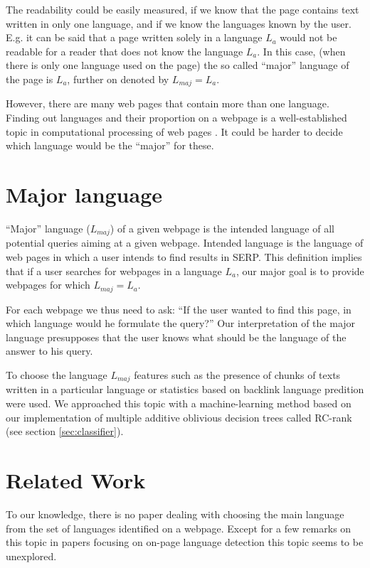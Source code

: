 \documentclass{acm_proc_article-sp}
\begin{document}
  The readability could be easily measured, if we know that the page contains text written in only one language,
  and if we know the languages known by the user.
  E.g. it can be said that a page written solely in a language $L_a$ would not be readable for a reader 
  that does not know the language $L_a$. 
  In this case, (when there is only one language used on the page) 
  the so called ``major'' language of the page is $L_a$, further on denoted by $L_{maj} = L_a$.
  
  However, there are many web pages that contain more than one language.
  Finding out languages and their proportion on a webpage is a well-established topic in computational processing of 
  web pages \cite{ Baldwin:shortlong, Campbell:supportvector, trenkle:ngram, Martins:langidentweb, Rehurek:languageidentification}.
  It could be harder to decide which language would be the ``major'' for these.
 
  \section{Major language}
  
  ``Major'' language ($L_{maj}$) of a given webpage is the intended language of all potential queries aiming at a given webpage.
  Intended language is the language of web pages in which a user intends to find results in SERP. 
  This definition implies that if a user searches for webpages in a language $L_a$, 
  our major goal is to provide webpages for which $L_{maj} = L_a$.
  
  For each webpage we thus need to ask: “If the user wanted to find this page, in which language would he formulate the query?” 
  Our interpretation of the major language presupposes that the user knows what should be the language of the answer to his query.

  To choose the language $L_{maj}$ features such as the presence of chunks of texts written in a particular language or statistics based on 
  backlink language predition were used. 
  We approached this topic with a machine-learning method based on our implementation of multiple additive oblivious decision trees called RC-rank (see section \ref{sec:classifier}).

\section{Related Work}

  To our knowledge, there is no paper dealing with choosing the main language from the set
  of languages identified on a webpage. Except for a few remarks on this topic in papers 
  focusing on on-page language detection this topic seems to be unexplored. 
  
\end{document}
